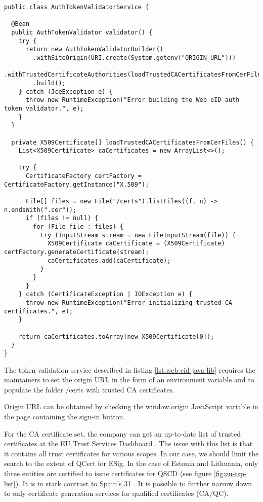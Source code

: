 \begin{lstlisting}[caption={Web eID Login Endpoint}, label={lst:web-eid-java-lib}]
public class AuthTokenValidatorService {

  @Bean
  public AuthTokenValidator validator() {
    try {
      return new AuthTokenValidatorBuilder()
        .withSiteOrigin(URI.create(System.getenv("ORIGIN_URL")))
        .withTrustedCertificateAuthorities(loadTrustedCACertificatesFromCerFiles())
        .build();
    } catch (JceException e) {
      throw new RuntimeException("Error building the Web eID auth token validator.", e);
    }
  }

  private X509Certificate[] loadTrustedCACertificatesFromCerFiles() {
    List<X509Certificate> caCertificates = new ArrayList<>();

    try {
      CertificateFactory certFactory = CertificateFactory.getInstance("X.509");

      File[] files = new File("/certs").listFiles((f, n) -> n.endsWith(".cer"));
      if (files != null) {
        for (File file : files) {
          try (InputStream stream = new FileInputStream(file)) {
            X509Certificate caCertificate = (X509Certificate) certFactory.generateCertificate(stream);
            caCertificates.add(caCertificate);
          }
        }
      }
    } catch (CertificateException | IOException e) {
      throw new RuntimeException("Error initializing trusted CA certificates.", e);
    }

    return caCertificates.toArray(new X509Certificate[0]);
  }
}
\end{lstlisting}

The token validation service described in listing \ref{lst:web-eid-java-lib} requires the maintainers to set the origin URL in the form of an environment variable and to populate the folder {/certs} with trusted CA certificates.

Origin URL can be obtained by checking the {window.origin} JavaScript variable in the page containing the sign-in button.

For the CA certificate set, the company can get an up-to-date list of trusted certificates at the EU Trust Services Dashboard \cite{eu-trustservices}. The issue with this list is that it contains all trust certificates for various scopes. In our case, we should limit the search to the extent of QCert for ESig. In the case of Estonia and Lithuania, only three entities are certified to issue certificates for QSCD (see figure \ref{fig:eu-tsp-list}). It is in stark contrast to Spain's 31 \cite{eu-trustservices}. It is possible to further narrow down to only certificate generation services for qualified certificates (CA/QC).

